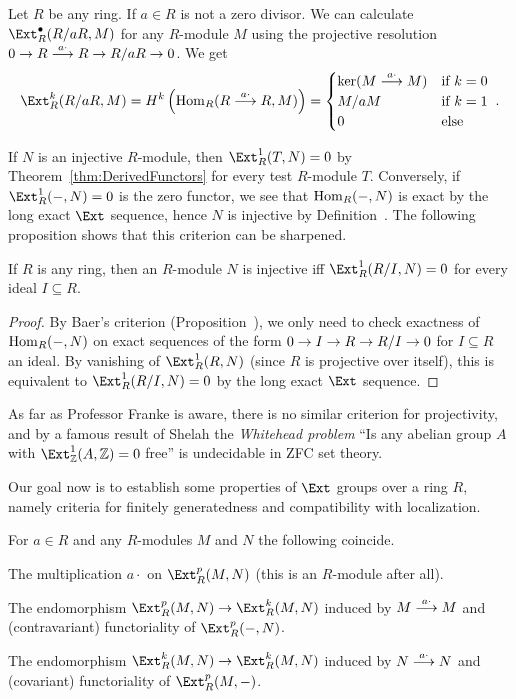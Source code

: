 \documentclass[a4paper,parskip=half,numbers=enddot, DIV=12]{scrreprt}
\begin{document}
\begin{example*}
	Let $R$ be any ring. If $a\in R$ is not a zero divisor. We can calculate $\Ext_R^\bullet(R/aR,M)$ for any $R$-module $M$ using the projective resolution $0\morphism R\morphism[ a\cdot]R\morphism R/aR\morphism 0$. We get
	\begin{align*}
		\Ext_R^k(R/aR,M)=H^k\left(\Hom_R(R\morphism[ a\cdot]R,M)\right)=\begin{cases}
			\ker(M\morphism[ a\cdot]M) & \text{if }k=0\\
			M/aM & \text{if }k=1\\
			0 & \text{else}
		\end{cases}\;.
	\end{align*}
\end{example*}
If $N$ is an injective $R$-module, then $\Ext_R^1(T,N)=0$ by Theorem~\ref{thm:DerivedFunctors} for every test $R$-module $T$. Conversely, if $\Ext_R^1(-,N)=0$ is the zero functor, we see that $\operatorname{Hom}_R(-,N)$ is exact by the long exact $\Ext$ sequence, hence $N$ is injective by Definition~. The following proposition shows that this criterion can be sharpened.
\begin{prop}
	If $R$ is any ring, then an $R$-module $N$ is injective iff $\Ext_R^1(R/I,N)=0$ for every ideal $I\subseteq R$.
\end{prop}
\begin{proof}
	By Baer's criterion (Proposition~), we only need to check exactness of $\operatorname{Hom}_R(-,N)$ on exact sequences of the form $0\morphism I\morphism R\morphism R/I\morphism 0$ for $I\subseteq R$ an ideal. By vanishing of $\Ext_R^1(R,N)$ (since $R$ is projective over itself), this is equivalent to $\Ext_R^1(R/I,N)=0$ by the long exact $\Ext$ sequence.
\end{proof}
\begin{rem*}
	As far as Professor Franke is aware, there is no similar criterion for projectivity, and by a famous result of Shelah the \emph{Whitehead problem} ``Is any abelian group $A$ with $\Ext_\IZ^1(A,\IZ)=0$ free'' is undecidable in ZFC set theory.
\end{rem*}
Our goal now is to establish some properties of $\Ext$ groups over a ring $R$, namely criteria for finitely generatedness and compatibility with localization.
\begin{fact}
	For $a\in R$ and any $R$-modules $M$ and $N$ the following coincide.
	\begin{alphanumerate}
		\item The multiplication $a\cdot $ on $\Ext_R^p(M,N)$ (this is an $R$-module after all).
		\item The endomorphism $\Ext_R^p(M,N)\morphism\Ext_R^k(M,N)$ induced by $M\morphism[ a\cdot]M$ and (contravariant) functoriality of $\Ext_R^p(-,N)$.
		\item The endomorphism $\Ext_R^k(M,N)\morphism\Ext_R^k(M,N)$ induced by $N\morphism[ a\cdot]N$ and (covariant) functoriality of $\Ext_R^p(M,-)$.
	\end{alphanumerate}
\end{fact}
\end{document}
